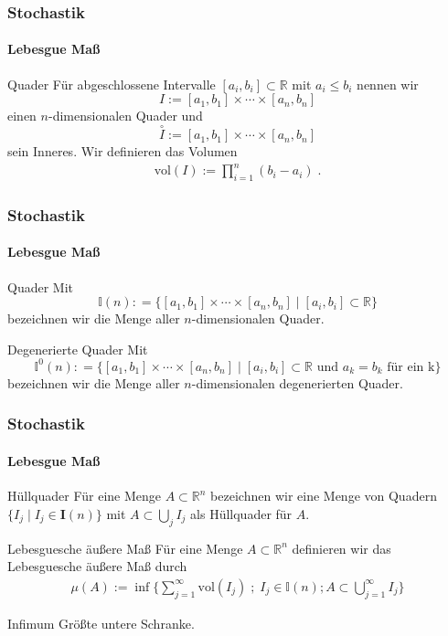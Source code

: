 \documentclass{beamer}
\begin{document}
\begin{frame}
    \frametitle{Stochastik}
\framesubtitle{Lebesgue Maß}
    \begin{block}{Quader}
Für abgeschlossene Intervalle $[a_i,b_i] \subset \mathbb{R}$ mit $a_i \leq b_i$ nennen wir 
$$I := [a_1,b_1] \times \cdots \times [a_n,b_n]$$ 
einen $n$-dimensionalen Quader und 
$$\overset{\circ}{I}:= [a_1, b_1] \times \cdots \times [a_n,b_n]$$
 sein Inneres. Wir definieren das Volumen 
\begin{align*}
\text{vol} (I):=   \prod_{i = 1}^n (b_i -a_i)  \; .
\end{align*}

\end{block}
 \end{frame}



\begin{frame}
    \frametitle{Stochastik}
\framesubtitle{Lebesgue Maß}
    \begin{block}{Quader}
Mit $$\mathbb{I}(n): = \{   [a_1,b_1] \times \cdots \times [a_n,b_n] \; | \;  [a_i, b_i] \subset \mathbb{R} \}$$ bezeichnen wir die Menge aller $n$-dimensionalen Quader. 
\end{block}
    \begin{block}{Degenerierte Quader}
Mit $$\mathbb{I}^0(n): = \{   [a_1,b_1] \times \cdots \times [a_n,b_n] \; | \;  [a_i, b_i] \subset \mathbb{R}  \text { und } a_k = b_k \text{ für ein k}\}$$ bezeichnen wir die Menge aller $n$-dimensionalen degenerierten Quader. 
\end{block}
 
 \end{frame}




\begin{frame}
    \frametitle{Stochastik}
\framesubtitle{Lebesgue Maß}

    \begin{block}{Hüllquader}
Für eine Menge $A \subset \mathbb{R}^n$ bezeichnen wir eine Menge von Quadern $\{ I_j \; | \;  I_j \in \mathbf{I}(n)  \}$ mit $A \subset \bigcup_j I_j$ als Hüllquader für $A$.
\end{block}

    \begin{block}{ Lebesguesche äußere Maß}
Für eine Menge $A \subset \mathbb{R}^n$ definieren wir das Lebesguesche äußere Maß durch 
\begin{align*}
\mu (A):=   \inf \biggl \{ \sum_{j=1}^{\infty}   \text{vol} (I_j)\; ; \; I_j \in \mathbb{I}(n); A \subset \bigcup_{j= 1}^{\infty} I_j \biggr \} 
\end{align*}
\end{block}
    \begin{block}{Infimum}
Größte untere Schranke.
\end{block}
 \end{frame}
\end{document}

